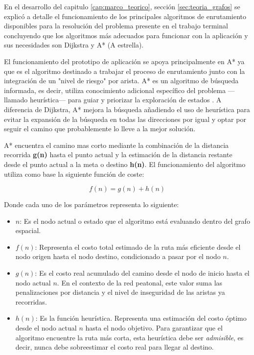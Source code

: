 En el desarrollo del capitulo \ref{cap:marco_teorico}, sección \ref{sec:teoria_grafos} se explicó a detalle el funcionamiento de los principales algoritmos de enrutamiento disponibles para la resolución del problema presente en el trabajo terminal concluyendo que los algoritmos más adecuados para funcionar con la aplicación y sus necesidades son Dijkstra y A* (A estrella). 

El funcionamiento del prototipo de aplicación se apoya principalmente en A* ya que es el algoritmo destinado a trabajar el proceso de enrutamiento junto con la integración de un "nivel de riesgo" por arista. A* es un algoritmo de búsqueda informada, es decir, utiliza conocimiento adicional específico del problema —llamado heurística— para guiar y priorizar la exploración de estados \cite{gfg_informed_search}. A diferencia de Dijkstra, A* mejora la búsqueda añadiendo el uso de heurística para evitar la expansión de la búsqueda en todas las direcciones por igual y optar por seguir el camino que probablemente lo lleve a la mejor solución.

A* encuentra el camino mas corto mediante la combinación de la distancia recorrida \textbf{g(n)} hasta el punto actual y la estimación de la distancia restante desde el punto actual a la meta o destino \textbf{h(n)}. El funcionamiento del algoritmo utiliza como base la siguiente función de coste: 

\begin{equation}
    f(n) = g(n) + h(n)
    \label{eq:a_star}
\end{equation}

Donde cada uno de los parámetros representa lo siguiente:

\begin{itemize}
    \item $n$: Es el nodo actual o estado que el algoritmo está evaluando dentro del grafo espacial.
    \item $f(n)$: Representa el costo total estimado de la ruta más eficiente desde el nodo origen hasta el nodo destino, condicionado a pasar por el nodo $n$.
    \item $g(n)$: Es el costo real acumulado del camino desde el nodo de inicio hasta el nodo actual $n$. En el contexto de la red peatonal, este valor suma las penalizaciones por distancia y el nivel de inseguridad de las aristas ya recorridas.
    \item $h(n)$: Es la función heurística. Representa una estimación del costo óptimo desde el nodo actual $n$ hasta el nodo objetivo. Para garantizar que el algoritmo encuentre la ruta más corta, esta heurística debe ser \textit{admisible}, es decir, nunca debe sobreestimar el costo real para llegar al destino.
\end{itemize}

